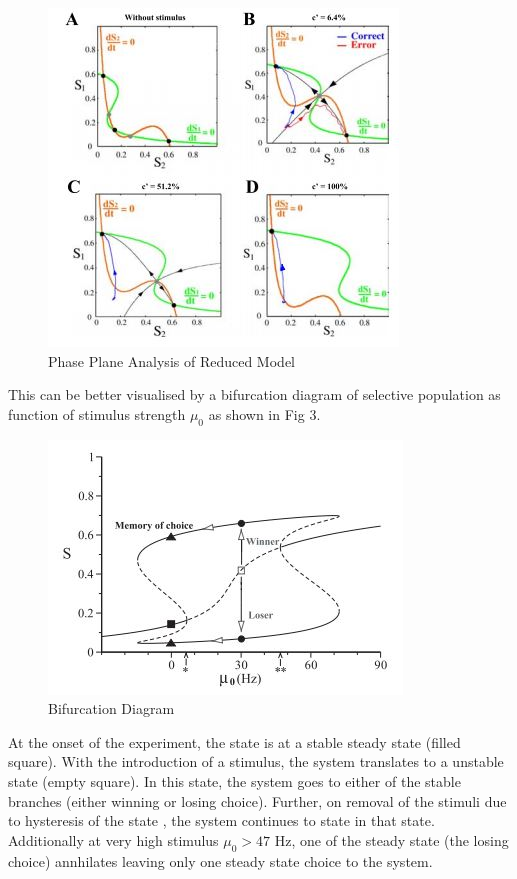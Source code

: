 \begin{figure}
  \includegraphics{fig/PhasePlaneAnalysisStimulus.jpg}
  \caption{Phase Plane Analysis of Reduced Model}
  \label{fig:Phase Plane Analysis of Reduced Model}
\end{figure}

This can be better visualised by a bifurcation diagram of selective population as function of stimulus strength $\mu_{0}$ as shown in Fig $3$. 

\begin{figure}
  \includegraphics{fig/BifurcationDiagram.jpg}
  \caption{Bifurcation Diagram}
  \label{fig:Bifurcation Diagram}
\end{figure}

At the onset of the experiment, the state is at a stable steady state (filled square). With the introduction of a stimulus, the system translates to a unstable state (empty square). In this state, the system goes to either of the stable branches (either winning or losing choice). Further, on removal of the stimuli due to hysteresis of the state , the system continues to state in that state. Additionally at very high stimulus $\mu_{0} > 47$ Hz, one of the steady state (the losing choice) annhilates leaving only one steady state choice to the system.

